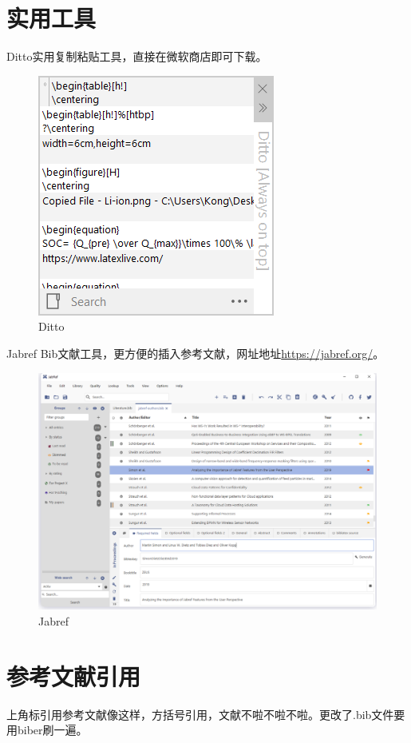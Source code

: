 \section{实用工具}
Ditto实用复制粘贴工具，直接在微软商店即可下载。
\begin{figure}[H]
\centering
\includegraphics[scale=0.55]{figure/chap2/2-1.png}
\caption{Ditto}
\label{fig2-1}
\end{figure}
Jabref Bib文献工具，更方便的插入参考文献，网址地址\url{https://jabref.org/}。
\begin{figure}[H]
\centering
\includegraphics[scale=0.3]{figure/chap2/2-2.png}
\caption{Jabref}
\label{fig2-2}
\end{figure}
\section{参考文献引用}
上角标引用参考文献像这样\cite{Zhu2023}，方括号引用，文献\parencite{Zhu2023a}不啦不啦不啦。更改了.bib文件要用biber刷一遍。
